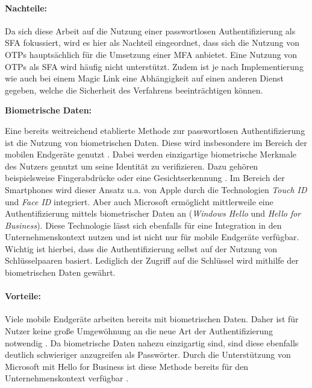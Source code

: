 \paragraph*{Nachteile:} Da sich diese Arbeit auf die Nutzung einer passwortlosen Authentifizierung als \ac{SFA} fokussiert, wird es hier als Nachteil eingeordnet, dass sich die Nutzung von \ac{OTP}s hauptsächlich für die Umsetzung einer \ac{MFA} anbietet. Eine Nutzung von \ac{OTP}s als \ac{SFA} wird häufig nicht unterstützt. Zudem ist je nach Implementierung wie auch bei einem Magic Link eine Abhängigkeit auf einen anderen Dienst gegeben, welche die Sicherheit des Verfahrens beeinträchtigen können.

\textbf{Biometrische Daten:}

Eine bereits weitreichend etablierte Methode zur passwortlosen Authentifizierung ist die Nutzung von biometrischen Daten. Diese wird insbesondere im Bereich der mobilen Endgeräte genutzt \cite{parmar2022comprehensive}. Dabei werden einzigartige biometrische Merkmale des Nutzers genutzt um seine Identität zu verifizieren. Dazu gehören beispielsweise Fingerabdrücke oder eine Gesichtserkennung \cite{parmar2022comprehensive}. Im Bereich der Smartphones wird dieser Ansatz u.a. von Apple durch die Technologien \textit{Touch ID} und \textit{Face ID} integriert. Aber auch Microsoft ermöglicht mittlerweile eine Authentifizierung mittels biometrischer Daten an (\textit{Windows Hello} und \textit{Hello for Business}). Diese Technologie lässt sich ebenfalls für eine Integration in den Unternehmenskontext nutzen und ist nicht nur für mobile Endgeräte verfügbar. Wichtig ist hierbei, dass die Authentifizierung selbst auf der Nutzung von Schlüsselpaaren basiert. Lediglich der Zugriff auf die Schlüssel wird mithilfe der biometrischen Daten gewährt.

\paragraph*{Vorteile:} Viele mobile Endgeräte arbeiten bereits mit biometrischen Daten. Daher ist für Nutzer keine große Umgewöhnung an die neue Art der Authentifizierung notwendig \cite{parmar2022comprehensive}. Da biometrische Daten nahezu einzigartig sind, sind diese ebenfalls deutlich schwieriger anzugreifen als Passwörter. Durch die Unterstützung von Microsoft mit Hello for Business ist diese Methode bereits für den Unternehmenskontext verfügbar \cite{parmar2022comprehensive}.

